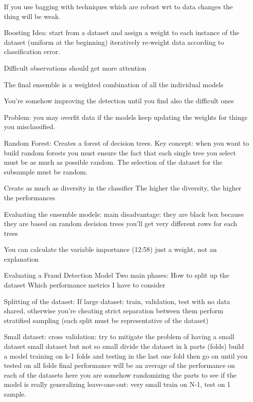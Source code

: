         If you use bagging with techniques which are robust wrt to data changes the thing will be weak.

    Boosting
        Idea: start from a dataset and assign a weight to each instance of the dataset (uniform at the beginning)
        iteratively re-weight data according to classification error.

        Difficult observations should get more attention

        The final ensemble is a weighted combination of all the individual models 

        You're somehow improving the detection until you find also the difficult ones 

        Problem: you may overfit data if the models keep updating the weights for things you misclassified.

    Random Forest:
        Creates a forest of decision trees.
        Key concept: when you want to build random forests you must ensure the fact that each single tree you select must be 
        as much as possible random.
        The selection of the dataset for the subsample must be random.

        Create as much as diversity in the classifier 
        The higher the diversity, the higher the performances

    Evaluating the ensemble models:
        main disadvantage: they are black box because they are based on random decision trees
        you'll get very different rows for each trees 

        You can calculate the variable importance (12:58)
        just a weight, not an explanation 

Evaluating a Fraud Detection Model
    Two main phases:
        How to split up the dataset 
        Which performance metrics I have to consider 
    
    Splitting of the dataset:
        If large dataset: train, validation, test with no data shared, otherwise you're cheating
            strict separation between them 
            perform stratified sampling (each split must be representative of the dataset)
        
        Small dataset:
            cross validation: try to mitigate the problem of having a small dataset 
                small dataset but not so small 
                divide the dataset in k parts (folds)
                build a model training on k-1 folds and testing in the last one fold 
                then go on until you tested on all folds 
                final performance will be an average of the performance on each of the datasets 
                here you are somehow randomizing the parts to see if the model is really generalizing
            leave-one-out: very small
                train on N-1, test on 1 sample.
            
